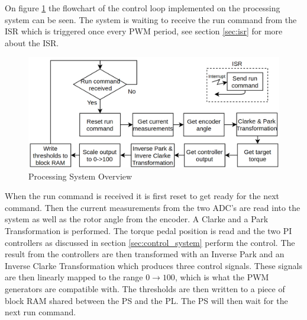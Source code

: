 On figure \ref{fig:software_flow} the flowchart of the control loop implemented on the processing system can be seen. The system is waiting to receive the run command from the ISR which is triggered once every PWM period, see section \ref{sec:isr} for more about the ISR. 


\begin{figure}[H]
	\centering
	\includegraphics[width=0.9\linewidth]{pictures/software/software_flow.png}
	\caption{Processing System Overview}
	\label{fig:software_flow}
\end{figure}

When the run command is received it is first reset to get ready for the next command. Then the current measurements from the two ADC's are read into the system as well as the rotor angle from the encoder. A Clarke and a Park Transformation is performed. The torque pedal position is read and the two PI controllers as discussed in section \ref{sec:control_system} perform the control. The result from the controllers are then transformed with an Inverse Park and an Inverse Clarke Transformation which produces three control signals. These signals are then linearly mapped to the range $0 \rightarrow 100$, which is what the PWM generators are compatible with. 
The thresholds are then written to a piece of block RAM shared between the PS and the PL. The PS will then wait for the next run command.



